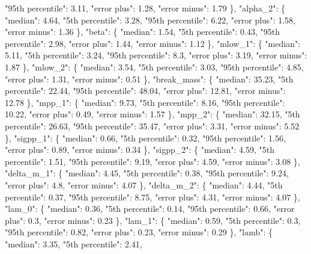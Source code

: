 {{        "95th percentile": 3.11, %
        "error plus": 1.28, %
        "error minus": 1.79%
      \}, %
      "alpha\_2": \{%
        "median": 4.64, %
        "5th percentile": 3.28, %
        "95th percentile": 6.22, %
        "error plus": 1.58, %
        "error minus": 1.36%
      \}, %
      "beta": \{%
        "median": 1.54, %
        "5th percentile": 0.43, %
        "95th percentile": 2.98, %
        "error plus": 1.44, %
        "error minus": 1.12%
      \}, %
      "mlow\_1": \{%
        "median": 5.11, %
        "5th percentile": 3.24, %
        "95th percentile": 8.3, %
        "error plus": 3.19, %
        "error minus": 1.87%
      \}, %
      "mlow\_2": \{%
        "median": 3.54, %
        "5th percentile": 3.03, %
        "95th percentile": 4.85, %
        "error plus": 1.31, %
        "error minus": 0.51%
      \}, %
      "break\_mass": \{%
        "median": 35.23, %
        "5th percentile": 22.44, %
        "95th percentile": 48.04, %
        "error plus": 12.81, %
        "error minus": 12.78%
      \}, %
      "mpp\_1": \{%
        "median": 9.73, %
        "5th percentile": 8.16, %
        "95th percentile": 10.22, %
        "error plus": 0.49, %
        "error minus": 1.57%
      \}, %
      "mpp\_2": \{%
        "median": 32.15, %
        "5th percentile": 26.63, %
        "95th percentile": 35.47, %
        "error plus": 3.31, %
        "error minus": 5.52%
      \}, %
      "sigpp\_1": \{%
        "median": 0.66, %
        "5th percentile": 0.32, %
        "95th percentile": 1.56, %
        "error plus": 0.89, %
        "error minus": 0.34%
      \}, %
      "sigpp\_2": \{%
        "median": 4.59, %
        "5th percentile": 1.51, %
        "95th percentile": 9.19, %
        "error plus": 4.59, %
        "error minus": 3.08%
      \}, %
      "delta\_m\_1": \{%
        "median": 4.45, %
        "5th percentile": 0.38, %
        "95th percentile": 9.24, %
        "error plus": 4.8, %
        "error minus": 4.07%
      \}, %
      "delta\_m\_2": \{%
        "median": 4.44, %
        "5th percentile": 0.37, %
        "95th percentile": 8.75, %
        "error plus": 4.31, %
        "error minus": 4.07%
      \}, %
      "lam\_0": \{%
        "median": 0.36, %
        "5th percentile": 0.14, %
        "95th percentile": 0.66, %
        "error plus": 0.3, %
        "error minus": 0.23%
      \}, %
      "lam\_1": \{%
        "median": 0.59, %
        "5th percentile": 0.3, %
        "95th percentile": 0.82, %
        "error plus": 0.23, %
        "error minus": 0.29%
      \}, %
      "lamb": \{%
        "median": 3.35, %
        "5th percentile": 2.41, %
}}
